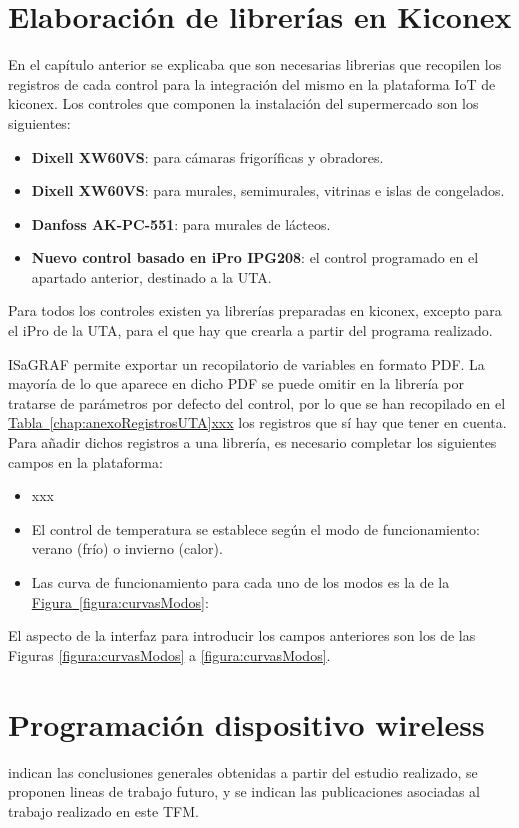 \section{Elaboración de librerías en Kiconex}
\label{sec:librerias}
En el capítulo anterior se explicaba que son necesarias librerias que recopilen los registros de cada control para la integración del mismo en la plataforma IoT de kiconex. Los controles que componen la instalación del supermercado son los siguientes:

\begin{itemize}
  \item \textbf{Dixell XW60VS}: para cámaras frigoríficas y obradores.
  \item \textbf{Dixell XW60VS}: para murales, semimurales, vitrinas e islas de congelados.
  \item \textbf{Danfoss AK-PC-551}: para murales de lácteos.
  \item \textbf{Nuevo control basado en iPro IPG208}: el control programado en el apartado anterior, destinado a la UTA.
\end{itemize}

Para todos los controles existen ya librerías preparadas en kiconex, excepto para el iPro de la UTA, para el que hay que crearla a partir del programa realizado. 

ISaGRAF permite exportar un recopilatorio de variables en formato PDF. La mayoría de lo que aparece en dicho PDF se puede omitir en la librería por tratarse de parámetros por defecto del control, por lo que se han recopilado en el \hyperref[chap:anexoRegistrosUTA]{Tabla~\ref{chap:anexoRegistrosUTA}xxx} los registros que sí hay que tener en cuenta. Para añadir dichos registros a una librería, es necesario completar los siguientes campos en la plataforma:

\begin{itemize}
  \item xxx
  \item El control de temperatura se establece según el modo de funcionamiento: verano (frío) o invierno (calor).
  \item Las curva de funcionamiento para cada uno de los modos es la de la \hyperref[figura:curvasModos]{Figura~\ref{figura:curvasModos}}:
\end{itemize}

El aspecto de la interfaz  para introducir los campos anteriores son los de las Figuras \hyperref[figura:curvasModos]{\ref{figura:curvasModos}} a \hyperref[figura:curvasModos]{\ref{figura:curvasModos}}.

\section{Programación dispositivo wireless}
\label{sec:programacionesp32}
indican las conclusiones generales obtenidas a partir del estudio realizado, se proponen lineas de trabajo futuro, y se indican las publicaciones asociadas al trabajo realizado en este TFM.